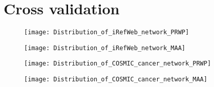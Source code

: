 \section{Cross validation}
\begin{figure}
    \label{fig:irefweb-prwp}
    \texttt{[image: Distribution\_of\_iRefWeb\_network\_PRWP]}
\end{figure}
\begin{figure}
    \label{fig:irefweb-maa}
    \texttt{[image: Distribution\_of\_iRefWeb\_network\_MAA]}
\end{figure}
\begin{figure}
    \label{fig:cosmic-prwp}
    \texttt{[image: Distribution\_of\_COSMIC\_cancer\_network\_PRWP]}
\end{figure}
\begin{figure}
    \label{fig:cosmic-maa}
    \texttt{[image: Distribution\_of\_COSMIC\_cancer\_network\_MAA]}
\end{figure}

